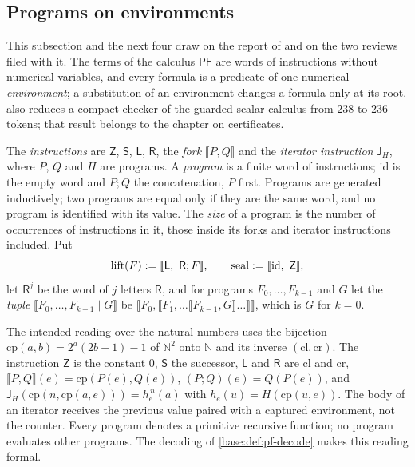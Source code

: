 \subsection{Programs on environments}
\label{base:sec:pf}

This subsection and the next four draw on the report of 
and on the two reviews filed with it.  The terms of the calculus
$\mathsf{PF}$ are words of instructions without numerical variables, and
every formula is a predicate of one numerical \emph{environment}; a
substitution of an environment changes a formula only at its root.
 also reduces a compact checker of the guarded scalar
calculus from $238$ to $236$ tokens; that result belongs to the chapter on
certificates.

\begin{definition}[Programs]
\label{base:def:pf-programs}
The \emph{instructions} are $\mathsf Z$, $\mathsf S$, $\mathsf L$,
$\mathsf R$, the \emph{fork} $\llbracket P,Q\rrbracket$ and the
\emph{iterator instruction} $\mathsf J_H$, where $P$, $Q$ and $H$ are
programs.  A \emph{program} is a finite word of instructions;
$\mathrm{id}$ is the empty word and $P;Q$ the concatenation, $P$ first.
Programs are generated inductively; two programs are equal only if they are
the same word, and no program is identified with its value.  The
\emph{size} of a program is the number of occurrences of instructions in
it, those inside its forks and iterator instructions included.  Put
\[
 \operatorname{lift}(F)\defeq\llbracket\mathsf L,\ \mathsf R;F\rrbracket,\qquad
 \operatorname{seal}\defeq\llbracket\mathrm{id},\ \mathsf Z\rrbracket,
\]
let $\mathsf R^{j}$ be the word of $j$ letters $\mathsf R$, and for programs
$F_0,\dots,F_{k-1}$ and $G$ let the \emph{tuple}
$\llbracket F_0,\dots,F_{k-1}\mid G\rrbracket$ be
$\llbracket F_0,\llbracket F_1,\dots\llbracket F_{k-1},G\rrbracket\dots\rrbracket\rrbracket$,
which is $G$ for $k=0$.
\end{definition}

The intended reading over the natural numbers uses the bijection
$\mathrm{cp}(a,b)=2^{a}(2b+1)-1$ of $\mathbb N^2$ onto $\mathbb N$ and its
inverse $(\mathrm{cl},\mathrm{cr})$.  The instruction $\mathsf Z$ is the
constant $0$, $\mathsf S$ the successor, $\mathsf L$ and $\mathsf R$ are
$\mathrm{cl}$ and $\mathrm{cr}$,
$\llbracket P,Q\rrbracket(e)=\mathrm{cp}(P(e),Q(e))$,
$(P;Q)(e)=Q(P(e))$, and
$\mathsf J_H(\mathrm{cp}(n,\mathrm{cp}(a,e)))=h_e^{\,n}(a)$ with
$h_e(u)=H(\mathrm{cp}(u,e))$.  The body of an iterator receives the previous
value paired with a captured environment, not the counter.  Every program
denotes a primitive recursive function; no program evaluates other
programs.  The decoding of \cref{base:def:pf-decode} makes this reading
formal.

